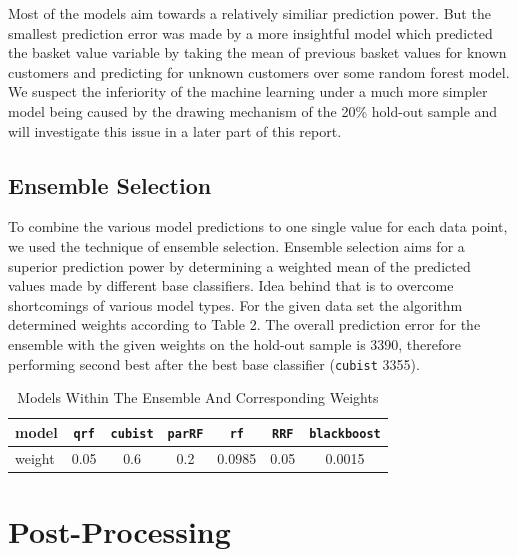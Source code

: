 Most of the models aim towards a relatively similiar prediction power. But the smallest prediction error was made by a more insightful model which predicted the basket value variable by taking the mean of previous basket values for known customers and predicting for unknown customers over some random forest model. 
We suspect the inferiority of the machine learning under a much more simpler model being caused by the drawing mechanism of the 20\% hold-out sample and will investigate this issue in a later part of this report.



\subsection{Ensemble Selection}

To combine the various model predictions to one single value for each data point, we used the technique of ensemble selection.\cite{Caruana04} Ensemble selection aims for a superior prediction power by determining a weighted mean of the predicted values made by different base classifiers. Idea behind that is to overcome shortcomings of various model types. For the given data set the algorithm determined weights according to Table 2. The overall prediction error for the ensemble with the given weights on the hold-out sample is 3390, therefore performing second best after the best base classifier (\texttt{cubist} 3355).

\begin{table}
\centering
\begin{tabular}{l|cccccc}
\hline
\hline
model &\texttt{qrf} & \texttt{cubist} & \texttt{parRF} & \texttt{rf} & \texttt{RRF} & \texttt{blackboost} \\ \hline
weight &0.05 & 0.6 & 0.2 & 0.0985 & 0.05 & 0.0015\\
\hline
\hline
\end{tabular}
\caption{Models Within The Ensemble And Corresponding Weights}
\end{table}


\section{Post-Processing}


